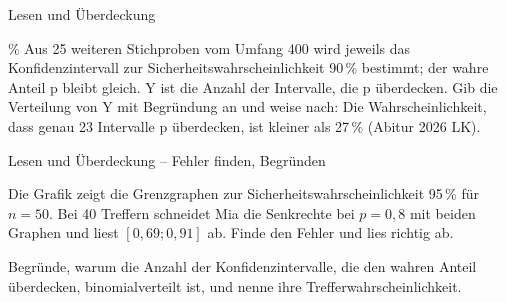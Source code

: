 \begin{aufgabe}{Lesen und Überdeckung}
\begin{teile}
\begin{zahlengerade}[xmin=30,xmax=65]         \end{zahlengerade}
\leerfeld \%
\teil Aus 25 weiteren Stichproben vom Umfang 400 wird jeweils das Konfidenzintervall zur Sicherheitswahrscheinlichkeit 90\,\% bestimmt; der wahre Anteil p bleibt gleich. Y ist die Anzahl der Intervalle, die p überdecken. Gib die Verteilung von Y mit Begründung an und weise nach: Die Wahrscheinlichkeit, dass genau 23 Intervalle p überdecken, ist kleiner als 27\,\% \hfill (Abitur 2026 LK).
\end{teile}
\end{aufgabe}

\begin{aufgabe}{Lesen und Überdeckung – Fehler finden, Begründen}
\begin{teile}
\teil Die Grafik zeigt die Grenzgraphen zur Sicherheitswahrscheinlichkeit 95\,\% für $n = 50$. Bei 40 Treffern schneidet Mia die Senkrechte bei $p = 0{,}8$ mit beiden Graphen und liest $[0{,}69; 0{,}91]$ ab. Finde den Fehler und lies richtig ab.

\begin{ksys}[xmin=0,xmax=1,ymin=0,ymax=1,xstep=0.1,ystep=0.1,xlabel=p,ylabel=h,ablesen]   \end{ksys}
\teil Begründe, warum die Anzahl der Konfidenzintervalle, die den wahren Anteil überdecken, binomialverteilt ist, und nenne ihre Trefferwahrscheinlichkeit.
\end{teile}
\end{aufgabe}
